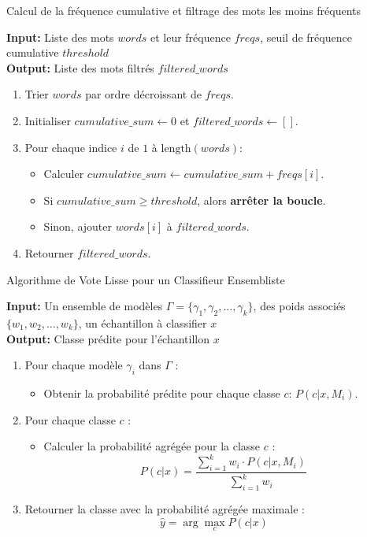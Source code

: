 \documentclass{article}
\begin{document}
\begin{algorithm}
\caption{Calcul de la fréquence cumulative et filtrage des mots les moins fréquents}
\textbf{Input:} Liste des mots $words$ et leur fréquence $freqs$, seuil de fréquence cumulative $threshold$ \\
\textbf{Output:} Liste des mots filtrés $filtered\_words$
\begin{enumerate}
    \item Trier $words$ par ordre décroissant de $freqs$.
    \item Initialiser $cumulative\_sum \gets 0$ et $filtered\_words \gets []$.
    \item Pour chaque indice $i$ de $1$ à $\text{length}(words)$:
    \begin{itemize}
        \item Calculer $cumulative\_sum \gets cumulative\_sum + freqs[i]$.
        \item Si $cumulative\_sum \geq threshold$, alors \textbf{arrêter la boucle}.
        \item Sinon, ajouter $words[i]$ à $filtered\_words$.
    \end{itemize}
    \item Retourner $filtered\_words$.
\end{enumerate}
\end{algorithm}

\begin{algorithm}
\caption{Algorithme de Vote Lisse pour un Classifieur Ensembliste}
\textbf{Input:} Un ensemble de modèles $\Gamma = \{\gamma_1, \gamma_2, \dots, \gamma_k\}$, des poids associés $\{w_1, w_2, \dots, w_k\}$, un échantillon à classifier $x$ \\
\textbf{Output:} Classe prédite pour l'échantillon $x$
\begin{enumerate}
    \item Pour chaque modèle $\gamma_i$ dans $\Gamma$ :
    \begin{itemize}
        \item Obtenir la probabilité prédite pour chaque classe $c$: $P(c|x, M_i)$.
    \end{itemize}
    \item Pour chaque classe $c$ :
    \begin{itemize}
        \item Calculer la probabilité agrégée pour la classe $c$ :
        \[
        P(c|x) = \frac{\sum_{i=1}^k w_i \cdot P(c|x, M_i)}{\sum_{i=1}^k w_i}
        \]
    \end{itemize}
    \item Retourner la classe avec la probabilité agrégée maximale :
    \[
    \hat{y} = \arg\max_c P(c|x)
    \]
\end{enumerate}
\end{algorithm}
\end{document}
